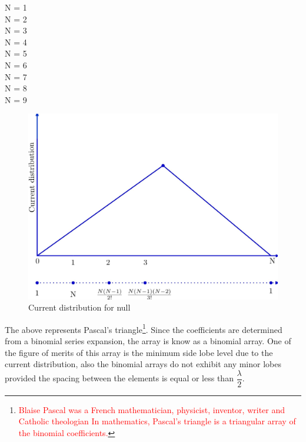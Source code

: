 N = 1\; \; \; \; \; \; \; \; \; \; \; \; \; \; \;\; \;  \; \; \\

N = 2\; \; \; \; \; \; \; \; \; \; \; \; \; \; \; \; \;  \; \; \\

N = 3\; \; \; \; \; \; \; \; \; \; \; \; \;  \; \;  \; \;  \; \; \\

N = 4\; \; \; \; \; \; \; \; \; \; \;  \; \;  \; \;  \; \;  \; \;  \\

N = 5\; \; \; \; \; \; \; \; \;  \; \;  \; \;  \; \;  \; \;  \; \; \\

N = 6\; \; \; \; \; \; \;  \; \;  \; \;  \; \;  \; \;  \; \;  \; \; \\

N = 7\; \; \; \; \;  \; \;  \; \;  \; \;  \; \;  \; \;  \; \;  \; \; \\

N = 8\; \; \;  \; \;  \; \;  \; \;  \; \;  \; \;  \; \;  \; \;  \; \; \\

N = 9\; \;   \;  \; \;  \; \;  \; \;\; \; \;  \; \;  \; \;  \; \; \\

\begin{figure}[h]
\centering
\includegraphics[width=1\linewidth]{graphics/img59_2}
\caption{Current distribution for null}
\label{fig:fig-1}
\end{figure}
The above represents Pascal's triangle\footnote{\textcolor{red}{Blaise Pascal was a French mathematician, physicist, inventor, writer and Catholic theologian In mathematics, Pascal's triangle is a triangular array of the binomial coefficients.}}. Since the coefficients are determined from a binomial series expansion, the array is know as a binomial array. One of the figure of merits of this array is the minimum side lobe level due to the current distribution, also the binomial arrays do not exhibit any minor lobes provided the spacing between the elements is equal or less than $\dfrac{\lambda}{2}$.\\

